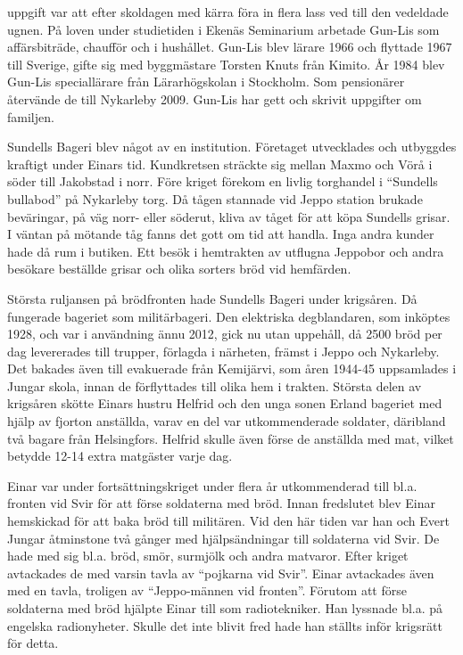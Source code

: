  uppgift var att efter skoldagen med kärra föra in flera lass ved till den vedeldade ugnen. På loven under studietiden i Ekenäs Seminarium arbetade Gun-Lis som affärsbiträde, chaufför och i hushållet. Gun-Lis blev lärare 1966 och flyttade 1967 till Sverige, gifte sig  med byggmästare Torsten Knuts från Kimito. År 1984 blev Gun-Lis speciallärare från Lärarhögskolan i Stockholm. Som pensionärer återvände de till Nykarleby 2009. Gun-Lis har gett och skrivit uppgifter om familjen.

Sundells Bageri blev något av en institution. Företaget utvecklades och utbyggdes kraftigt under Einars tid. Kundkretsen sträckte sig mellan Maxmo och Vörå i söder till Jakobstad i norr. Före kriget förekom en livlig torghandel i ``Sundells bullabod'' på Nykarleby torg. Då tågen stannade vid Jeppo station brukade beväringar, på väg norr- eller  söderut, kliva av tåget för att köpa Sundells grisar. I väntan på mötande tåg fanns det gott om tid att handla. Inga andra kunder hade då rum i butiken. Ett besök i hemtrakten av utflugna Jeppobor och andra besökare beställde grisar och olika sorters bröd vid hemfärden.

Största ruljansen på brödfronten hade Sundells Bageri under krigsåren. Då fungerade bageriet som militärbageri. Den elektriska degblandaren, som inköptes 1928, och var i användning ännu 2012, gick nu utan uppehåll, då 2500 bröd per dag levererades till trupper, förlagda i närheten, främst i Jeppo och Nykarleby. Det bakades även till evakuerade från Kemijärvi, som åren 1944-45 uppsamlades i Jungar skola, innan de förflyttades till olika hem i trakten. Största delen av krigsåren skötte Einars hustru Helfrid och den unga sonen Erland bageriet med hjälp av fjorton anställda, varav en del var utkommenderade soldater, däribland två bagare från Helsingfors. Helfrid skulle även förse de anställda med mat, vilket betydde 12-14 extra matgäster varje dag.

Einar var under fortsättningskriget under flera år utkommenderad till bl.a. fronten vid Svir för att förse soldaterna med bröd. Innan fredslutet blev Einar hemskickad för att baka bröd till militären. Vid den här tiden var han och Evert Jungar åtminstone två gånger med hjälpsändningar till soldaterna vid Svir. De hade med sig bl.a. bröd, smör, surmjölk och andra matvaror. Efter kriget avtackades de med varsin tavla av ``pojkarna vid Svir''. Einar avtackades även med en tavla, troligen av ``Jeppo-männen vid fronten''. Förutom att förse soldaterna med bröd hjälpte Einar till som radiotekniker. Han lyssnade bl.a. på engelska radionyheter. Skulle det inte blivit fred hade han ställts inför krigsrätt för detta.

